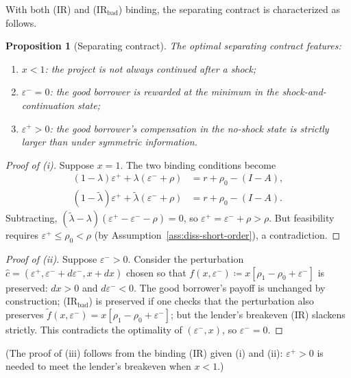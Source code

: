 \documentclass[11pt,a4paper,oneside]{book}
\def\leq{\leqslant}
\theoremstyle{plain}
\newtheorem{proposition}[theorem]{Proposition}
\theoremstyle{definition}
\theoremstyle{remark}
\numberwithin{equation}{chapter}
\begin{document}
With both (IR) and (IR$_{\text{bad}}$) binding, the separating contract is characterized as follows.

\begin{proposition}[Separating contract]\label{prop:diss-short-sep}
The optimal separating contract features:
\begin{enumerate}
  \item[\textup{(i)}] $x < 1$: the project is \emph{not} always continued after a shock;
  \item[\textup{(ii)}] $\varepsilon^- = 0$: the good borrower is rewarded at the minimum in the shock-and-continuation state;
  \item[\textup{(iii)}] $\varepsilon^+ > 0$: the good borrower's compensation in the no-shock state is strictly larger than under symmetric information.
\end{enumerate}
\end{proposition}

\begin{proof}[Proof of (i)]
Suppose $x = 1$.
The two binding conditions become
\begin{align*}
  (1 - \lambda) \varepsilon^+ + \lambda (\varepsilon^- + \rho) &= r + \rho_0 - (I - A), \\
  (1 - \widetilde{\lambda}) \varepsilon^+ + \widetilde{\lambda} (\varepsilon^- + \rho) &= r + \rho_0 - (I - A).
\end{align*}
Subtracting, $(\widetilde{\lambda} - \lambda)(\varepsilon^+ - \varepsilon^- - \rho) = 0$, so $\varepsilon^+ = \varepsilon^- + \rho > \rho$.
But feasibility requires $\varepsilon^+ \leq \rho_0 < \rho$ (by Assumption~\ref{ass:diss-short-order}), a contradiction.
\end{proof}

\begin{proof}[Proof of (ii)]
Suppose $\varepsilon^- > 0$.
Consider the perturbation $\widehat{c} = (\varepsilon^+, \varepsilon^- + d\varepsilon^-, x + dx)$ chosen so that $f(x, \varepsilon^-) \coloneqq x[\rho_1 - \rho_0 + \varepsilon^-]$ is preserved: $dx > 0$ and $d\varepsilon^- < 0$.
The good borrower's payoff is unchanged by construction; (IR$_{\text{bad}}$) is preserved if one checks that the perturbation also preserves $\widetilde{f}(x, \varepsilon^-) = x[\rho_1 - \rho_0 + \varepsilon^-]$; but the lender's breakeven (IR) slackens strictly.
This contradicts the optimality of $(\varepsilon^-, x)$, so $\varepsilon^- = 0$.
\end{proof}

(The proof of (iii) follows from the binding (IR) given (i) and (ii): $\varepsilon^+ > 0$ is needed to meet the lender's breakeven when $x < 1$.)
\end{document}
